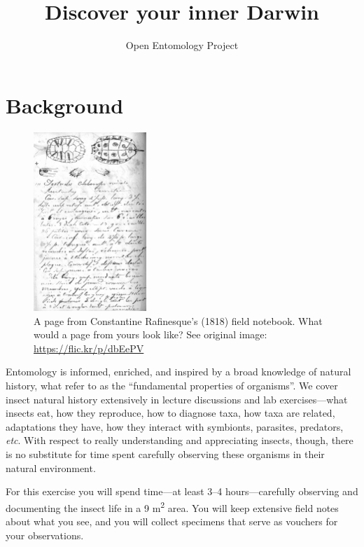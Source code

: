 \documentclass[letterpaper, 11pt]{article}
\title{Discover your inner Darwin}%
\author{Open Entomology Project}
\begin{document}
\cleanlookdateon %
\maketitle
\thispagestyle{fancy}

\section*{Background}
\begin{figure}
  \vspace{-20pt}
  \begin{center}
    \includegraphics[width=0.38\textwidth]{Rafinesque}
  \end{center}
  \vspace{-16pt}
  \caption{A page from Constantine Rafinesque's (1818) field notebook. What would a page from yours look like? See original image: \url{https://flic.kr/p/dbEePV}}
  \vspace{-38pt}
\end{figure}
Entomology is informed, enriched, and inspired by a broad knowledge of natural history, what \cite{Tewksbury01042014} refer to as the ``fundamental properties of organisms''. We cover insect natural history extensively in lecture discussions and lab exercises---what insects eat, how they reproduce, how to diagnose taxa, how taxa are related, adaptations they have, how they interact with symbionts, parasites, predators, \textit{etc}. With respect to really understanding and appreciating insects, though, there is no substitute for time spent carefully observing these organisms in their natural environment. 

For this exercise you will spend time---at least 3--4 hours---carefully observing and documenting the insect life in a 9 m\textsuperscript{2} area. You will keep extensive field notes about what you see, and you will collect specimens that serve as vouchers for your observations.
\end{document}
